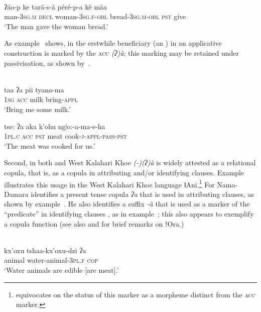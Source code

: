 \documentclass[output=paper]{LSP/langsci}
\begin{document}
\begin{exe}
\ex\label{09-mc-ex:2}
\\
\gll ʔáo-p ke tará-s-à péré-p-a kè màa\\
man-3\textsc{sg.m} \textsc{decl} woman-3\textsc{sg.f}-\textsc{obl} bread-3\textsc{sg.m}-\textsc{obl} \textsc{pst} give\\
\glt ‘The man gave the woman bread.’ 
\end{exe}

As example~ shows, in  the erstwhile beneficiary (an ) in an applicative construction is marked by the \textsc{acc} \textit{(ʔ)à}; this marking may be retained under passivisation, as shown by~.

\ea
{}\\

\ea\label{09-mc-ex:3}
\gll taa ʔa pii tyana-ma\\
1\textsc{sg} \textsc{acc} milk bring-\textsc{appl}\\
\glt ‘Bring me some milk.’

\ex\label{09-mc-ex:4}
\gll tse: ʔa aka k’ohu ngǀo:-a-ma-e-ha\\
1\textsc{pl.c} \textsc{acc} \textsc{pst} meat cook-\textsc{j}-\textsc{appl}-\textsc{pass}-\textsc{pst}\\
\glt ‘The meat was cooked for us.’
\z
\z

Second, in both  and West Kalahari Khoe \textit{(-)(ʔ)à} is widely attested as a relational copula, that is, as a copula in attributing and/or identifying clauses. Example~ illustrates this usage in the West Kalahari Khoe language ǁAni.\footnote{\citet{Heine1999Ani} equivocates on the status of this marker as a morpheme distinct from the \textsc{acc} marker.} For Nama-Damara \citet[114–116, 164]{Hagman1973Nama} identifies a present tense copula \textit{ʔa} that is used in attributing clauses, as shown by example~. He also identifies a suffix \textit{-à} that is used as a marker of the “predicate” in identifying clauses \citep[110]{Hagman1973Nama}, as in example~; this also appears to exemplify a copula function (see also \citealt[174]{Vossen1997Khoe} and \citealt[342]{Haacke2013Gora} for brief remarks on ǃOra.)

\begin{exe}
\ex\label{09-mc-ex:5}
\\
\gll kx’oxu tshaa-kx’oxu-dzi ʔa \\
animal water-animal-3\textsc{pl.f} \textsc{cop}\\
\glt ‘Water animals are edible [are meat].’ 
\end{exe}
\end{document}
